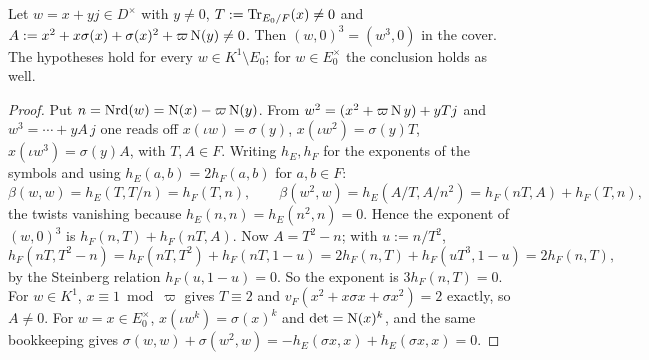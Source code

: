 \begin{proposition}\label{W:prop:cubeidentity}
Let $w=x+yj\in D^\times$ with $y\ne0$, $T:=\operatorname{Tr}_{E_0/F}(x)\ne0$ and
$A:=x^2+x\sigma(x)+\sigma(x)^2+\varpi\operatorname N(y)\ne0$.  Then
$(w,0)^3=(w^3,0)$ in the cover.  The hypotheses hold for every
$w\in K^1\setminus E_0$; for $w\in E_0^\times$ the conclusion holds as well.
\end{proposition}
\begin{proof}
Put $n=\operatorname{Nrd}(w)=\operatorname N(x)-\varpi\operatorname N(y)$.  From $w^2=(x^2+\varpi\operatorname N y)+yTj$ and
$w^3=\cdots+yA\,j$ one reads off $x(\iota w)=\sigma(y)$,
$x(\iota w^2)=\sigma(y)T$, $x(\iota w^3)=\sigma(y)A$, with $T,A\in F$.
Writing $h_E,h_F$ for the exponents of the symbols and using
$h_E(a,b)=2h_F(a,b)$ for $a,b\in F$:
\[
 \beta(w,w)=h_E(T,T/n)=h_F(T,n),\qquad
 \beta(w^2,w)=h_E(A/T,A/n^2)=h_F(nT,A)+h_F(T,n),
\]
the twists vanishing because $h_E(n,n)=h_E(n^2,n)=0$.  Hence the exponent
of $(w,0)^3$ is $h_F(n,T)+h_F(nT,A)$.  Now $A=T^2-n$; with $u:=n/T^2$,
\[
 h_F(nT,T^2-n)=h_F(nT,T^2)+h_F(nT,1-u)=2h_F(n,T)+h_F(uT^3,1-u)=2h_F(n,T),
\]
by the Steinberg relation $h_F(u,1-u)=0$.  So the exponent is
$3h_F(n,T)=0$.  For $w\in K^1$, $x\equiv1\bmod\varpi$ gives $T\equiv2$ and
$v_F(x^2+x\sigma x+\sigma x^2)=2$ exactly, so $A\ne0$.  For $w=x\in E_0^\times$,
$x(\iota w^k)=\sigma(x)^k$ and $\det=\operatorname N(x)^k$, and the same bookkeeping
gives $\sigma(w,w)+\sigma(w^2,w)=-h_E(\sigma x,x)+h_E(\sigma x,x)=0$.
\end{proof}

